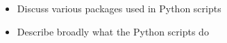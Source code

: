 \begin{itemize}
    \item Discuss various packages used in Python scripts
    \item Describe broadly what the Python scripts do
\end{itemize}


